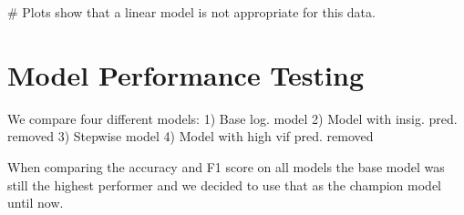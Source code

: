 \documentclass[
  letterpaper,
  DIV=11,
  numbers=noendperiod]{scrartcl}
\newenvironment{Shaded}{\begin{snugshade}}{\end{snugshade}}
\newcommand{\CommentTok}[1]{\textcolor[rgb]{0.37,0.37,0.37}{#1}}
\begin{document}
\begin{Shaded}
\begin{Highlighting}[]
\CommentTok{\# Plots show that a linear model is not appropriate for this data.}
\end{Highlighting}
\end{Shaded}

\section{Model Performance Testing}\label{model-performance-testing}

We compare four different models: 1) Base log. model 2) Model with
insig. pred. removed 3) Stepwise model 4) Model with high vif pred.
removed

When comparing the accuracy and F1 score on all models the base model
was still the highest performer and we decided to use that as the
champion model until now.
\end{document}

